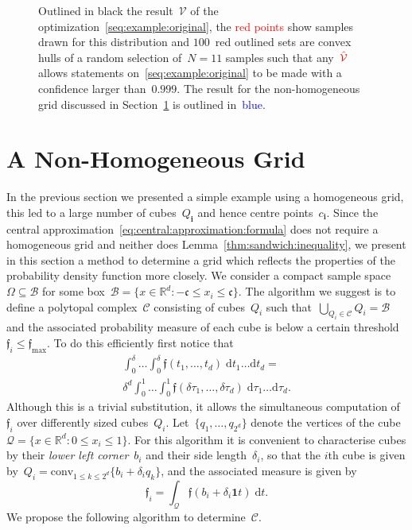 \documentclass[letterpaper, 10pt, conference]{ieeeconf} %
\providecommand{\conv}{\text{conv}}
\providecommand{\bfa}[1]{\mathbf{#1}}
\begin{document}
\begin{figure}\centering

\captionsetup{font=small}
\caption{Outlined in black the result~$\mathcal V$ of the optimization~\eqref{seq:example:original}, the \textcolor{red}{red points} show samples drawn for this distribution and $100$~red outlined sets are convex hulls of a random selection of~$N=11$ samples such that any~$\textcolor{red}{\hat{\mathcal V}}$ allows statements on~\eqref{seq:example:original} to be made with a confidence larger than~$0.999$.
%
The result for the non-homogeneous grid discussed in Section~\ref{sec:improved:grid} is outlined in~\textcolor{blue}{blue}.}
\label{fig:example:in:comparison}
\end{figure}
%
%
%
\section{A Non-Homogeneous Grid}\label{sec:improved:grid}
%
%
%
\noindent In the previous section we presented a simple example using a homogeneous grid, this led to a large number of cubes~$Q_\bfa{i}$ and hence centre points~$c_\bfa{i}$.
%
Since the central approximation~\eqref{eq:central:approximation:formula} does not require a homogeneous grid and neither does Lemma~\ref{thm:sandwich:inequality}, we present in this section a method to determine a grid which reflects the properties of the probability density function more closely.
%
We consider a compact sample space~$\Omega\subseteq\mathcal B$ for some box~$\mathcal B=\{x\in\mathbb R^d:-\mathfrak{c}\leq x_i\leq \mathfrak{c}\}$.
%
The algorithm we suggest is to define a polytopal complex~$\mathcal C$ consisting of cubes~$Q_i$ such that~$\bigcup_{Q_i\in\mathcal C}Q_i=\mathcal B$ and the associated probability measure of each cube is below a certain threshold~$\mathfrak{f}_i\leq\mathfrak{f}_{\max}$.
%
To do this efficiently first notice that
\begin{multline*}
\int_0^{\delta}\dots\int_0^\delta \mathfrak{f}(t_1,\dots,t_d)\; \mathrm d t_1\dots \mathrm dt _d = \\ \delta^d\int_0^1\dots\int_0^1 \mathfrak {f}(\delta\tau_1,\dots,\delta\tau_d)
\; \mathrm d\tau_1\dots \mathrm d\tau_d .
\end{multline*}
Although this is a trivial substitution, it allows the simultaneous computation of~$\mathfrak{f}_i$ over differently sized cubes~$Q_i$.
%
Let~$\{q_1,\dots,q_{2^d}\}$ denote the vertices of the cube~$\mathcal Q=\{x\in\mathbb R^d: 0\leq x_i\leq 1\}$. For this algorithm it is convenient to characterise cubes by their \emph{lower left corner}~$b_i$ and their side length~$\delta_i$, so that the $i$th cube is given by~$Q_i=\conv_{1\leq k\leq2^d}\{b_i+\delta_i q_k\}$, and the associated measure is given by
\[
\mathfrak{f}_i=\int_{\mathcal Q}\mathfrak{f}(b_i+\delta_i\bfa{1} t) \; \mathrm d t.
\]
%
We propose the following algorithm to determine~$\mathcal C$.
\end{document}
